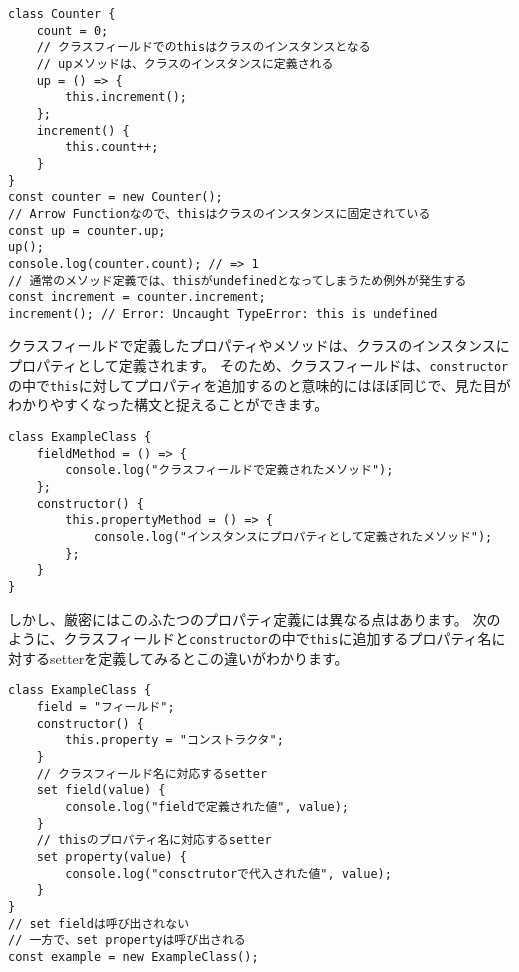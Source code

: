 \begin{lstlisting}
class Counter {
    count = 0;
    // クラスフィールドでのthisはクラスのインスタンスとなる
    // upメソッドは、クラスのインスタンスに定義される
    up = () => {
        this.increment();
    };
    increment() {
        this.count++;
    }
}
const counter = new Counter();
// Arrow Functionなので、thisはクラスのインスタンスに固定されている
const up = counter.up;
up();
console.log(counter.count); // => 1
// 通常のメソッド定義では、thisがundefinedとなってしまうため例外が発生する
const increment = counter.increment;
increment(); // Error: Uncaught TypeError: this is undefined
\end{lstlisting}

\begin{tcolorbox}[enhanced jigsaw,breakable,title=クラスフィールドとインスタンスのプロパティの違い]\label{difference-between-class-fields-and-instance-property}

クラスフィールドで定義したプロパティやメソッドは、クラスのインスタンスにプロパティとして定義されます。
そのため、クラスフィールドは、\texttt{constructor}の中で\texttt{this}に対してプロパティを追加するのと意味的にはほぼ同じで、見た目がわかりやすくなった構文と捉えることができます。

\begin{lstlisting}
class ExampleClass {
    fieldMethod = () => {
        console.log("クラスフィールドで定義されたメソッド");
    };
    constructor() {
        this.propertyMethod = () => {
            console.log("インスタンスにプロパティとして定義されたメソッド");
        };
    }
}
\end{lstlisting}

しかし、厳密にはこのふたつのプロパティ定義には異なる点はあります。
次のように、クラスフィールドと\texttt{constructor}の中で\texttt{this}に追加するプロパティ名に対するsetterを定義してみるとこの違いがわかります。

\begin{lstlisting}
class ExampleClass {
    field = "フィールド";
    constructor() {
        this.property = "コンストラクタ";
    }
    // クラスフィールド名に対応するsetter
    set field(value) {
        console.log("fieldで定義された値", value);
    }
    // thisのプロパティ名に対応するsetter
    set property(value) {
        console.log("consctrutorで代入された値", value);
    }
}
// set fieldは呼び出されない
// 一方で、set propertyは呼び出される
const example = new ExampleClass();
\end{lstlisting}


\end{tcolorbox}
